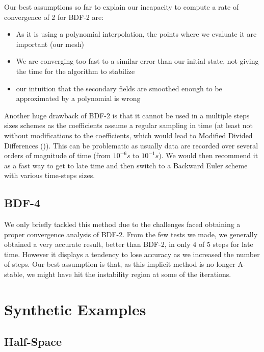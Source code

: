 \documentclass[twoside]{article}
\begin{document}
Our best assumptions so far to explain our incapacity to compute a rate of convergence of 2 for BDF-2 are:
\begin{itemize}
\item As it is using a polynomial interpolation, the points where we evaluate it are important (our mesh)
\item We are converging too fast to a similar error than our initial state, not giving the time for the algorithm to stabilize
\item our intuition that the secondary fields are smoothed enough to be approximated by a polynomial is wrong
\end{itemize}

Another huge drawback of BDF-2 is that it cannot be used in a multiple steps sizes schemes as the coefficients assume a regular sampling in time (at least not without modifications to the coefficients, which would lead to Modified Divided Differences (\cite{krogh})). This can be problematic as usually data are recorded over several orders of magnitude of time (from $10^{-6}s$ to $10^{-1}s$). We would then recommend it as a fast way to get to late time and then switch to a Backward Euler scheme with various time-steps sizes.

\subsection{BDF-4}
We  only briefly tackled this method due to the challenges faced obtaining a proper convergence analysis of BDF-2. From the few tests we made, we generally obtained a very accurate result, better than BDF-2, in only 4 of 5 steps for late time. However it displays a tendency to lose accuracy as we increased the number of steps. Our best assumption is that, as this implicit method is no longer A-stable, we might have hit the instability region at some of the iterations.

\newpage

\section{Synthetic Examples}

\subsection{Half-Space}
\end{document}
